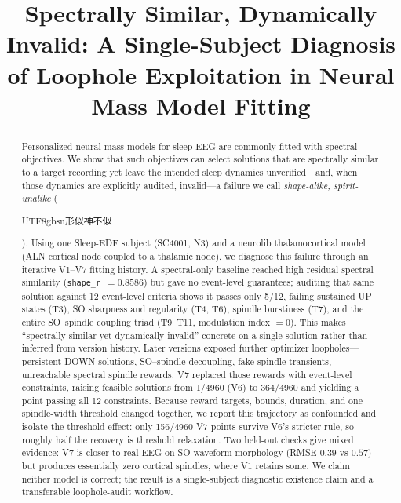 \documentclass[conference]{IEEEtran}
\newcommand{\code}[1]{\texttt{#1}}
\begin{document}
\title{Spectrally Similar, Dynamically Invalid: A Single-Subject Diagnosis of
Loophole Exploitation in Neural Mass Model Fitting}

\author{
}

\maketitle

\begin{abstract}
Personalized neural mass models for sleep EEG are commonly fitted with spectral
objectives. We show that such objectives can select solutions that are
spectrally similar to a target recording yet leave the intended sleep dynamics
unverified---and, when those dynamics are explicitly audited, invalid---a
failure we call \emph{shape-alike, spirit-unalike}
(\begin{CJK}{UTF8}{gbsn}形似神不似\end{CJK}). Using one Sleep-EDF subject
(SC4001, N3) and a neurolib thalamocortical model (ALN cortical node coupled to
a thalamic node), we diagnose this failure through an iterative V1--V7 fitting
history. A spectral-only baseline reached high residual spectral similarity
(\code{shape\_r}~$=0.8586$) but gave no event-level guarantees; auditing that
same solution against 12 event-level criteria shows it passes only 5/12,
failing sustained UP states (T3), SO sharpness and regularity (T4, T6), spindle
burstiness (T7), and the entire SO--spindle coupling triad (T9--T11, modulation
index $=0$). This makes ``spectrally similar yet dynamically invalid'' concrete
on a single solution rather than inferred from version history. Later versions
exposed further optimizer loopholes---persistent-DOWN solutions, SO--spindle
decoupling, fake spindle transients, unreachable spectral spindle rewards. V7
replaced those rewards with event-level constraints, raising feasible solutions
from 1/4960 (V6) to 364/4960 and yielding a point passing all 12 constraints.
Because reward targets, bounds, duration, and one spindle-width threshold
changed together, we report this trajectory as confounded and isolate the
threshold effect: only 156/4960 V7 points survive V6's stricter rule, so
roughly half the recovery is threshold relaxation. Two held-out checks give
mixed evidence: V7 is closer to real EEG on SO waveform morphology (RMSE $0.39$
vs $0.57$) but produces essentially zero cortical spindles, where V1 retains
some. We claim neither model is correct; the result is a single-subject
diagnostic existence claim and a transferable loophole-audit workflow.
\end{abstract}
\end{document}

